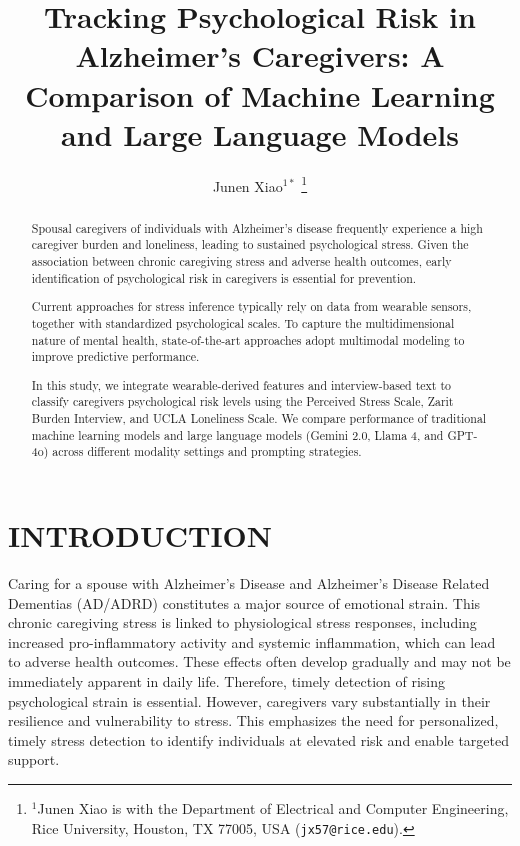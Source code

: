 \documentclass[letterpaper, 10 pt, conference]{ieeeconf}  %
\title{\LARGE \bf
Tracking Psychological Risk in Alzheimer’s Caregivers: A Comparison of Machine Learning and Large Language Models
}
\author{%
Junen Xiao$^{1*}$%
\thanks{$^{1}$Junen Xiao is with the Department of Electrical and Computer Engineering, Rice University, Houston, TX 77005, USA (\texttt{jx57@rice.edu}).}%
}
\begin{document}
\maketitle
\thispagestyle{empty}
\pagestyle{empty}


\begin{abstract}
Spousal caregivers of individuals with Alzheimer's disease frequently experience a high caregiver burden and loneliness, leading to sustained psychological stress. Given the association between chronic caregiving stress and adverse health outcomes, early identification of psychological risk in caregivers is essential for prevention.

Current approaches for stress inference typically rely on data from wearable sensors, together with standardized psychological scales. To capture the multidimensional nature of mental health, state-of-the-art approaches adopt multimodal modeling to improve predictive performance.

In this study, we integrate wearable-derived features and interview-based text to classify caregivers psychological risk levels using the Perceived Stress Scale, Zarit Burden Interview, and UCLA Loneliness Scale. We compare performance of traditional machine learning models and large language models (Gemini 2.0, Llama 4, and GPT-4o) across different modality settings and prompting strategies. 
\end{abstract}


\section{INTRODUCTION}
Caring for a spouse with Alzheimer's Disease and Alzheimer's Disease Related Dementias (AD/ADRD) constitutes a major source of emotional strain\cite{stress}. This chronic caregiving stress is linked to physiological stress responses, including increased pro-inflammatory activity and systemic inflammation, which can lead to adverse health outcomes\cite{caregivingstress,family}. These effects often develop gradually and may not be immediately apparent in daily life\cite{immediate}. Therefore, timely detection of rising psychological strain is essential. However, caregivers vary substantially in their resilience and vulnerability to stress\cite{resilience}. This emphasizes the need for personalized, timely stress detection to identify individuals at elevated risk and enable targeted support.
\end{document}
